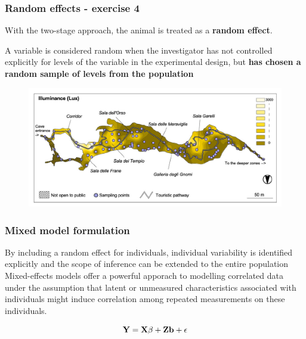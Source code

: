 \documentclass[10pt]{beamer}
\begin{document}
\begin{frame}[fragile]
\frametitle{Random effects - exercise 4}

With the two-stage approach, the animal is treated as a {\bf random effect}.\\
\vspace{0.5cm}

A variable is considered random when the investigator has not controlled explicitly for levels of the variable in the experimental design, but {\bf has chosen a random sample of levels from the population}

\begin{center}
\begin{figure}
\includegraphics[width=0.8\linewidth]{pictures/samplingpoints}
\end{figure}
\end{center}

\end{frame}




\begin{frame}[fragile]
\frametitle{Mixed model formulation}

By including a random effect for individuals, individual variability is identified explicitly and the scope of inference can be extended to the entire population\\
\vspace{0.5cm}
Mixed-effects models offer a powerful apporach to modelling correlated data under the assumption that latent or unmeasured characteristics associated with individuals might induce correlation among repeated measurements on these individuals.

$$ {\bf Y = X\beta + Zb + \epsilon} $$


\end{frame}
\end{document}
